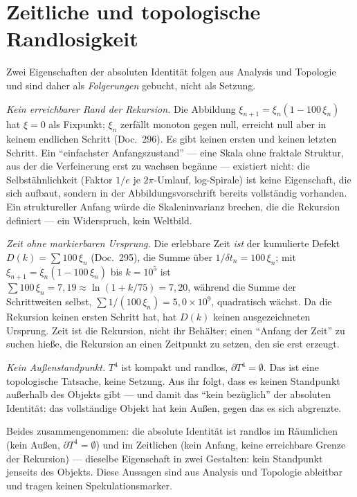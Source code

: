 \section{Zeitliche und topologische Randlosigkeit}

Zwei Eigenschaften der absoluten Identität folgen aus Analysis und Topologie und
sind daher als \emph{Folgerungen} gebucht, nicht als Setzung.

\emph{Kein erreichbarer Rand der Rekursion.} Die Abbildung
$\xi_{n+1}=\xi_n(1-100\,\xi_n)$ hat $\xi=0$ als Fixpunkt; $\xi_n$ zerfällt monoton
gegen null, erreicht null aber in keinem endlichen Schritt (Doc.~296). Es gibt
keinen ersten und keinen letzten Schritt. Ein \enquote{einfachster Anfangszustand}
--- eine Skala ohne fraktale Struktur, aus der die Verfeinerung erst zu wachsen
begänne --- existiert nicht: die Selbstähnlichkeit (Faktor $1/e$ je $2\pi$-Umlauf,
log-Spirale) ist keine Eigenschaft, die sich aufbaut, sondern in der
Abbildungsvorschrift bereits vollständig vorhanden. Ein struktureller Anfang würde
die Skaleninvarianz brechen, die die Rekursion definiert --- ein Widerspruch, kein
Weltbild.

\emph{Zeit ohne markierbaren Ursprung.} Die erlebbare Zeit \emph{ist} der
kumulierte Defekt $D(k)=\sum 100\,\xi_n$ (Doc.~295), die Summe über
$1/\delta t_n = 100\,\xi_n$; mit $\xi_{n+1}=\xi_n(1-100\,\xi_n)$ bis
$k = 10^5$ ist $\sum 100\,\xi_n = 7{,}19 \approx \ln(1+k/75) = 7{,}20$, während
die Summe der Schrittweiten selbst, $\sum 1/(100\,\xi_n) = 5{,}0\times10^9$,
quadratisch wächst. Da die Rekursion keinen ersten Schritt hat, hat
$D(k)$ keinen ausgezeichneten Ursprung. Zeit ist die Rekursion, nicht ihr
Behälter; einen \enquote{Anfang der Zeit} zu suchen hieße, die Rekursion an einen
Zeitpunkt zu setzen, den sie erst erzeugt.

\emph{Kein Außenstandpunkt.} $T^4$ ist kompakt und randlos, $\partial T^4 =
\emptyset$. Das ist eine topologische Tatsache, keine Setzung. Aus ihr folgt, dass
es keinen Standpunkt außerhalb des Objekts gibt --- und damit das \enquote{kein
bezüglich} der absoluten Identität: das vollständige Objekt hat kein Außen, gegen
das es sich abgrenzte.

Beides zusammengenommen: die absolute Identität ist randlos im Räumlichen (kein
Außen, $\partial T^4=\emptyset$) und im Zeitlichen (kein Anfang, keine erreichbare
Grenze der Rekursion) --- dieselbe Eigenschaft in zwei Gestalten: kein Standpunkt
jenseits des Objekts. Diese Aussagen sind aus Analysis und Topologie ableitbar und
tragen keinen Spekulationsmarker.

